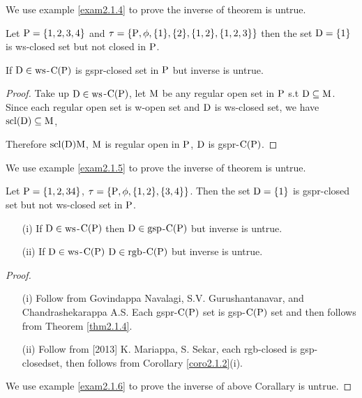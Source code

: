 We use example \ref{exam2.1.4} to prove the inverse of theorem is untrue. 

\begin{exm}\label{exam2.1.4}
Let $\mathrm{P}= \{1, 2, 3, 4\}$ and  $\tau= \{\mathrm{P}, \phi, \{1\}, \{2\}, \{1, 2\}, \{1, 2, 3\}\}$ then the set $\mathrm{D} = \{1\}$ is ws-closed set but not closed in $\mathrm{P}$.
\end{exm}

\begin{thm}\label{thm2.1.4}
If $\mathrm{D}\in \mathrm{ws}$-$\mathrm{C}(\mathrm{P})$ is gspr-closed set in $\mathrm{P}$ but inverse is untrue.
\end{thm}

\begin{proof}
Take up $\mathrm{D}\in\mathrm{ws}$-$\mathrm{C}(\mathrm{P})$, let $\mathrm{M}$ be any regular open set in $\mathrm{P}$ s.t $\mathrm{D} \subseteq \mathrm{M}$. Since each regular open set is w-open set and $\mathrm{D}$ is ws-closed set, we have $\mathrm{scl}(\mathrm{D})\subseteq \mathrm{M}$,

Therefore $\mathrm{scl}(\mathrm{D})\mathrm{M}$, $\mathrm{M}$ is regular open in $\mathrm{P}$, $\mathrm{D}$ is gspr-$\mathrm{C}(\mathrm{P})$.
\end{proof}

We use example \ref{exam2.1.5} to prove the inverse of theorem is untrue.

\begin{exm}\label{exam2.1.5}
Let $\mathrm{P} = \{1, 2, 3 4\}$, $\tau = \{\mathrm{P},\phi,\{1, 2\}, \{3, 4\}\}$. Then the set $\mathrm{D}= \{1\}$ is gspr-closed set but not ws-closed set in $\mathrm{P}$.
\end{exm}

\begin{coro}\label{coro2.1.2}
\begin{itemize}
\item[(i)] If $\mathrm{D}\in \mathrm{ws}$-$\mathrm{C}(\mathrm{P})$ then $\mathrm{D}\in \mathrm{gsp}$-$\mathrm{C}(\mathrm{P})$ but inverse is untrue.
\item[(ii)] If $\mathrm{D}\in \mathrm{ws}$-$\mathrm{C}(\mathrm{P})$ $\mathrm{D}\in \mathrm{rgb}$-$\mathrm{C}(\mathrm{P})$ but inverse is untrue.
\end{itemize}
\end{coro}

\begin{proof}
\begin{itemize}
\item[(i)] Follow from \cite{Navalagi2} Govindappa Navalagi, S.V. Gurushantanavar, and Chandrashekarappa A.S. Each gspr-$\mathrm{C}(\mathrm{P})$ set is gsp-$\mathrm{C}(\mathrm{P})$ set and then follows from Theorem \ref{thm2.1.4}.

\item[(ii)] Follow from [2013] K. Mariappa, S. Sekar, \cite{Mariappa} each rgb-closed is gsp-closedset, then follows from Corollary \ref{coro2.1.2}(i).
\end{itemize}
We use example \ref{exam2.1.6} to prove the inverse of above Corallary is untrue.
\end{proof}

